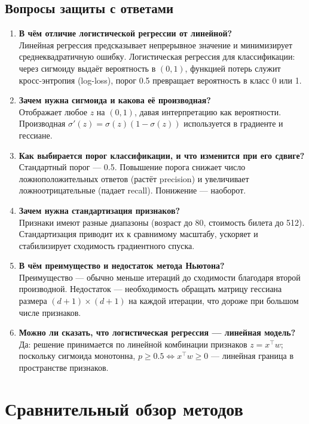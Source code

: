 \documentclass[12pt,a4paper]{article}
\begin{document}
\subsection{Вопросы защиты с ответами}
\begin{enumerate}
\item \textbf{В чём отличие логистической регрессии от линейной?}\\
Линейная регрессия предсказывает непрерывное значение и минимизирует среднеквадратичную ошибку. Логистическая регрессия для классификации: через сигмоиду выдаёт вероятность в $(0,1)$, функцией потерь служит кросс-энтропия (log-loss), порог 0.5 превращает вероятность в класс 0 или 1.
\item \textbf{Зачем нужна сигмоида и какова её производная?}\\
Отображает любое $z$ на $(0,1)$, давая интерпретацию как вероятности. Производная $\sigma'(z) = \sigma(z)(1-\sigma(z))$ используется в градиенте и гессиане.
\item \textbf{Как выбирается порог классификации, и что изменится при его сдвиге?}\\
Стандартный порог --- 0.5. Повышение порога снижает число ложноположительных ответов (растёт precision) и увеличивает ложноотрицательные (падает recall). Понижение --- наоборот.
\item \textbf{Зачем нужна стандартизация признаков?}\\
Признаки имеют разные диапазоны (возраст до 80, стоимость билета до 512). Стандартизация приводит их к сравнимому масштабу, ускоряет и стабилизирует сходимость градиентного спуска.
\item \textbf{В чём преимущество и недостаток метода Ньютона?}\\
Преимущество --- обычно меньше итераций до сходимости благодаря второй производной. Недостаток --- необходимость обращать матрицу гессиана размера $(d+1)\times(d+1)$ на каждой итерации, что дороже при большом числе признаков.
\item \textbf{Можно ли сказать, что логистическая регрессия --- линейная модель?}\\
Да: решение принимается по линейной комбинации признаков $z = x^\top w$; поскольку сигмоида монотонна, $p \ge 0.5 \iff x^\top w \ge 0$ --- линейная граница в пространстве признаков.
\end{enumerate}

\section{Сравнительный обзор методов}
\end{document}

